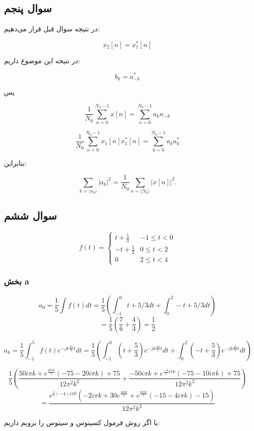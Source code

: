 \documentclass[12pt]{article}
\begin{document}
\newpage
\subsection{سوال پنجم}

در نتیجه سوال قبل قرار می‌دهیم:

$$x_2[n] = x^*_1[n]$$

در نتیجه این موضوع داریم:

$$b_k = a^*_{-k}$$

پس

$$
\frac{1}{N_{0}} \sum_{n=0}^{N_{0}-1} x[n]=\sum_{n=0}^{N_{0}-1} a_{k} n_{-k}
$$

$$
\frac{1}{N_{0}} \sum_{n=0}^{N_{0}-1} x_1[n] x_1^*[n]=\sum_{k=0}^{N_{0}-1} a_{k} a^*_{k}
$$

بنابراین:

$$
\sum_{k=\langle n_0\rangle}\left|a_{k}\right|^{2}=\frac{1}{N_0} \sum_{n=\langle N_0\rangle}|x[n]|^{2} .
$$

\newpage
\subsection{سوال ششم}
$$
f(t)=\left\{\begin{array}{lc}
	t+\frac{5}{3} & -1 \leq t<0 \\
	-t+\frac{5}{3} & 0 \leq t<2 \\
	0 & 2 \leq t<4
\end{array}\right.
$$

\subsubsection{بخش a}
$$a_0 = \frac{1}{5} \int f(t) dt = \frac{1}{5}( \int_{-1}^{0} t + 5/3 dt  + \int_{0}^{2} -t + 5/3 dt )$$
$$= \frac{1}{5}(\frac{7}{6} + \frac{4}{3}) =\boxed{ \frac{1}{2}}$$

$$a_k = \frac{1}{5} \int_{-1}^{5} f(t) e^{-j k \frac{2\pi}{5} t} dt = \frac{1}{5} (\int_{-1}^{0} (t+\frac{5}{3}) e^{-j k \frac{2\pi}{5} t} dt + \int_{0}^{2} (-t+\frac{5}{3}) e^{-j k \frac{2\pi}{5} t} dt)$$


$$\frac{1}{5} (\frac{50 i \pi  k+e^{\frac{2 i \pi  k}{5}} (-75-20 i \pi  k)+75}{12 \pi ^2 k^2} + \frac{-50 i \pi  k+e^{\frac{-4}{5} i \pi  k} (-75-10 i \pi  k)+75}{12 \pi ^2 k^2})$$$$ = \frac{e^{\frac{1}{5} (-4) i \pi  k} \left(-2 i \pi  k+30 e^{\frac{4 i \pi  k}{5}}+e^{\frac{6 i \pi  k}{5}} (-15-4 i \pi  k)-15\right)}{12 \pi ^2 k^2} $$


یا اگر روش فرمول کسینوس و سینوس را برویم داریم:
\end{document}
